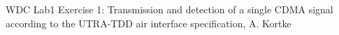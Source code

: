 


	

	
	
	
	
	
	

	
	
	
	\begin{thebibliography}{99}
	 WDC Lab1 Exercise 1: Transmission and detection of a single CDMA signal according to the UTRA-TDD air interface specification, A. Kortke
		
	\end{thebibliography}
	
	
